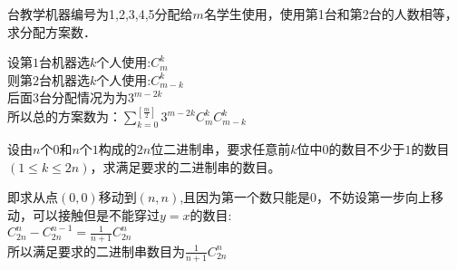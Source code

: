 \documentclass[12pt,letterpaper, onecolumn]{exam}
\begin{document}
\begin{questions}
    \begin{solution}
    \end{solution}


  台教学机器编号为1,2,3,4,5分配给$m$名学生使用，使用第1台和第2台的人数相等，求分配方案数．
    \begin{solution}
        设第$1$台机器选$k$个人使用:$C_m^k$\\
        则第$2$台机器选$k$个人使用:$C_{m-k}^k$\\
        后面3台分配情况为为$3^{m-2k}$\\
        所以总的方案数为：$\sum_{k=0}^{[\frac{m}{2}]} 3^{m-2k}C_m^k C_{m-k}^k $
        
    \end{solution}



 \question   设由\(n\)个\(0\)和\(n\)个\(1\)构成的\(2n\)位二进制串，要求任意前\(k\)位中\(0\)的数目不少于\(1\)的数目\((1\leq k\leq 2n)\)，求满足要求的二进制串的数目。
    \begin{solution}
        即求从点$(0,0)$移动到$(n,n)$,且因为第一个数只能是0，不妨设第一步向上移动，可以接触但是不能穿过$y=x$的数目:\\
        $C_{2n}^n-C_{2n}^{n-1}=\frac{1}{n+1}C_{2n}^n$\\
        所以满足要求的二进制串数目为$\frac{1}{n+1}C_{2n}^n$
    \end{solution}




\end{questions}
\end{document}
